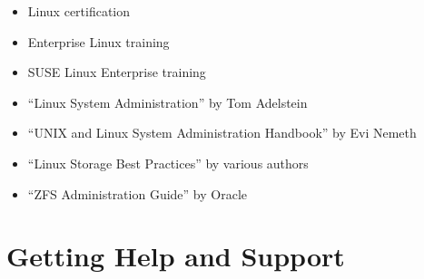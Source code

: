 \documentclass[letterpaper,10pt,english]{sphinxmanual}
\begin{document}
\sphinxAtStartPar
{}
\begin{itemize}
\item {} 
\sphinxAtStartPar
{}%
\begin{footnote}[15]\sphinxAtStartFootnote
{}
%
\end{footnote} \sphinxhyphen{} Linux certification

\item {} 
\sphinxAtStartPar
{}%
\begin{footnote}[16]\sphinxAtStartFootnote
{}
%
\end{footnote} \sphinxhyphen{} Enterprise Linux training

\item {} 
\sphinxAtStartPar
{}%
\begin{footnote}[17]\sphinxAtStartFootnote
{}
%
\end{footnote} \sphinxhyphen{} SUSE Linux Enterprise training

\end{itemize}

\sphinxAtStartPar
{}
\begin{itemize}
\item {} 
\sphinxAtStartPar
“Linux System Administration” by Tom Adelstein

\item {} 
\sphinxAtStartPar
“UNIX and Linux System Administration Handbook” by Evi Nemeth

\item {} 
\sphinxAtStartPar
“Linux Storage Best Practices” by various authors

\item {} 
\sphinxAtStartPar
“ZFS Administration Guide” by Oracle

\end{itemize}


\section{Getting Help and Support}
\label{\detokenize{downloads:getting-help-and-support}}
\end{document}
